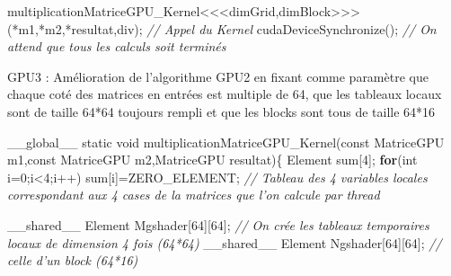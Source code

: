 \documentclass[]{article}
\newenvironment{Shaded}{\begin{snugshade}}{\end{snugshade}}
\newcommand{\KeywordTok}[1]{\textcolor[rgb]{0.13,0.29,0.53}{\textbf{{#1}}}}
\newcommand{\DataTypeTok}[1]{\textcolor[rgb]{0.13,0.29,0.53}{{#1}}}
\newcommand{\DecValTok}[1]{\textcolor[rgb]{0.00,0.00,0.81}{{#1}}}
\newcommand{\CommentTok}[1]{\textcolor[rgb]{0.56,0.35,0.01}{\textit{{#1}}}}
\newcommand{\NormalTok}[1]{{#1}}
\begin{document}
\begin{Shaded}
\begin{Highlighting}[]
    \NormalTok{multiplicationMatriceGPU_Kernel<<<dimGrid,dimBlock>>>(*m1,*m2,*resultat,div); }\CommentTok{// Appel du Kernel}
    \NormalTok{cudaDeviceSynchronize(); }\CommentTok{// On attend que tous les calculs soit terminés}
\end{Highlighting}
\end{Shaded}

GPU3 : Amélioration de l'algorithme GPU2 en fixant comme paramètre que
chaque coté des matrices en entrées est multiple de 64, que les tableaux
locaux sont de taille 64*64 toujours rempli et que les blocks sont tous
de taille 64*16

\begin{Shaded}
\begin{Highlighting}[]
\NormalTok{__global__ }\DataTypeTok{static} \DataTypeTok{void} \NormalTok{multiplicationMatriceGPU_Kernel(}\DataTypeTok{const} \NormalTok{MatriceGPU m1,}\DataTypeTok{const} \NormalTok{MatriceGPU m2,MatriceGPU resultat)\{}
    \NormalTok{Element sum[}\DecValTok{4}\NormalTok{];}
    \KeywordTok{for}\NormalTok{(}\DataTypeTok{int} \NormalTok{i=}\DecValTok{0}\NormalTok{;i<}\DecValTok{4}\NormalTok{;i++)}
        \NormalTok{sum[i]=ZERO_ELEMENT; }\CommentTok{// Tableau des 4 variables locales correspondant aux 4 cases de la matrices que l'on calcule par thread}
    
    \NormalTok{__shared__ Element Mgshader[}\DecValTok{64}\NormalTok{][}\DecValTok{64}\NormalTok{]; }\CommentTok{// On crée les tableaux temporaires locaux de dimension 4 fois (64*64)}
    \NormalTok{__shared__ Element Ngshader[}\DecValTok{64}\NormalTok{][}\DecValTok{64}\NormalTok{]; }\CommentTok{// celle d'un block (64*16)}
    

\end{Highlighting}
\end{Shaded}
\end{document}
